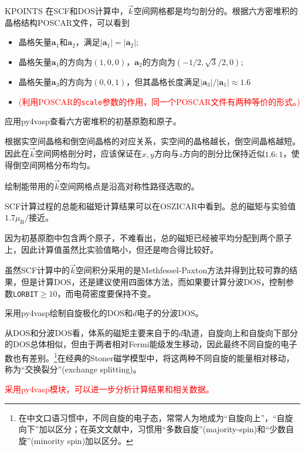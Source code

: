 \textrm{KPOINTS}
在\textrm{SCF}和\textrm{DOS}计算中，$\vec k$空间网格都是均匀剖分的。根据六方密堆积的晶格结构\textrm{POSCAR}文件，可以看到
\begin{itemize}
	\item 晶格矢量$\mathbf{a}_1$和$\mathbf{a}_2$，满足$|\mathbf{a}_1|=|\mathbf{a}_2|$;
	\item 晶格矢量$\mathbf{a}_1$的方向为$(1,0,0)$，$\mathbf{a}_2$的方向为$(-1/2,\sqrt3/2,0)$;
	\item 晶格矢量$\mathbf{a}_3$的方向为$(0,0,1)$，但其晶格长度满足$|\mathbf{a}_3|/|\mathbf{a}_1|\approx1.6$
	\item \textcolor{red}{(利用\textrm{POSCAR}的\texttt{scale}参数的作用，同一个\textrm{POSCAR}文件有两种等价的形式。)}
\end{itemize}
应用\textrm{py4vasp}查看六方密堆积的初基原胞和原子。

根据实空间晶格和倒空间晶格的对应关系，实空间的晶格越长，倒空间晶格越短。因此在$\vec k$空间网格剖分时，应该保证在$x,y$方向与$z$方向的剖分比保持近似$1.6:1$，使得倒空间网格分布均匀。

绘制能带用的$\vec k$空间网格点是沿高对称性路径选取的。

\textrm{SCF}计算过程的总能和磁矩计算结果可以在\textrm{OSZICAR}中看到。总的磁矩与实验值$1.7\mu_{\mathrm{B}}$/接近。

因为初基原胞中包含两个原子，不难看出，总的磁矩已经被平均分配到两个原子上，因此计算值虽然比实验值略小，但还是吻合得比较好。

虽然\textrm{SCF}计算中的$\vec k$空间积分采用的是\textrm{Methfessel-Paxton}方法并得到比较可靠的结果，但是计算\textrm{DOS}，还是建议使用四面体方法，而如果要计算分波\textrm{DOS}，控制参数\texttt{LORBIT}$\geqslant10$，而电荷密度要保持不变。

采用\textrm{py4vasp}绘制自旋极化的\textrm{DOS}和$d$电子的分波\textrm{DOS}。

从\textrm{DOS}和分波\textrm{DOS}看，体系的磁矩主要来自于的$d$轨道，自旋向上和自旋向下部分的\textrm{DOS}总体相似，但由于两者相对\textrm{Fermi}能级发生移动，因此最终不同自旋的电子数也有差别。\footnote{在中文口语习惯中，不同自旋的电子态，常常人为地成为``自旋向上''，``自旋向下''加以区分；在英文文献中，习惯用``多数自旋''\textrm{(majority-spin)}和``少数自旋''\textrm{(minority spin)}加以区分。}在经典的\textrm{Stoner}磁学模型中，将这两种不同自旋的能量相对移动，称为``交换裂分''\textrm{(exchange splitting)}。

\textcolor{red}{采用\textrm{py4vasp}模块，可以进一步分析计算结果和相关数据。}

